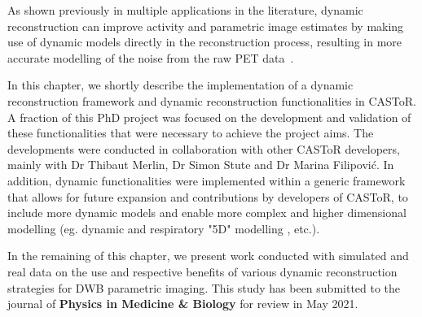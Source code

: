 As shown previously in multiple applications in the literature, dynamic reconstruction can improve activity and parametric image estimates by making use of dynamic models directly in the reconstruction process, resulting in more accurate modelling of the noise from the raw PET data~\cite{Reader2014}. 

In this chapter, we shortly describe the implementation of a dynamic reconstruction framework and dynamic reconstruction functionalities in CASToR. A fraction of this PhD project was focused on the development and validation of these functionalities that were necessary to achieve the project aims. The developments were conducted in collaboration with other CASToR developers, mainly with Dr Thibaut Merlin, Dr Simon Stute and Dr Marina Filipović.
In addition, dynamic functionalities were implemented within a generic framework that allows for future expansion and contributions by developers of CASToR, to include more dynamic models and enable more complex and higher dimensional modelling (eg. dynamic and respiratory "5D" modelling , etc.).

In the remaining of this chapter, we present work conducted with simulated and real data on the use and respective benefits of various dynamic reconstruction strategies for DWB parametric imaging. This study has been submitted to the journal of \textbf{Physics in Medicine \& Biology} for review in May 2021. 


